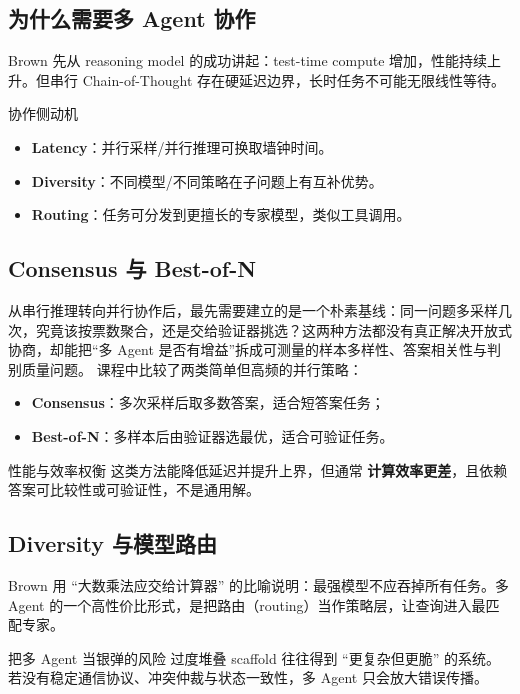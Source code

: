 \documentclass[a4paper]{article}
\begin{document}
\subsection{为什么需要多 Agent 协作}
Brown 先从 reasoning model 的成功讲起：test-time compute 增加，性能持续上升。但串行 Chain-of-Thought 存在硬延迟边界，长时任务不可能无限线性等待。

\begin{knowledgebox}{协作侧动机}
\begin{itemize}
    \item \textbf{Latency}：并行采样/并行推理可换取墙钟时间。
    \item \textbf{Diversity}：不同模型/不同策略在子问题上有互补优势。
    \item \textbf{Routing}：任务可分发到更擅长的专家模型，类似工具调用。
\end{itemize}
\end{knowledgebox}

\subsection{Consensus 与 Best-of-N}
从串行推理转向并行协作后，最先需要建立的是一个朴素基线：同一问题多采样几次，究竟该按票数聚合，还是交给验证器挑选？这两种方法都没有真正解决开放式协商，却能把“多 Agent 是否有增益”拆成可测量的样本多样性、答案相关性与判别质量问题。
课程中比较了两类简单但高频的并行策略：
\begin{itemize}
    \item \textbf{Consensus}：多次采样后取多数答案，适合短答案任务；
    \item \textbf{Best-of-N}：多样本后由验证器选最优，适合可验证任务。
\end{itemize}

\begin{importantbox}{性能与效率权衡}
这类方法能降低延迟并提升上界，但通常 \textbf{计算效率更差}，且依赖答案可比较性或可验证性，不是通用解。
\end{importantbox}

\subsection{Diversity 与模型路由}
Brown 用 ``大数乘法应交给计算器'' 的比喻说明：最强模型不应吞掉所有任务。多 Agent 的一个高性价比形式，是把路由（routing）当作策略层，让查询进入最匹配专家。

\begin{warningbox}{把多 Agent 当银弹的风险}
过度堆叠 scaffold 往往得到 ``更复杂但更脆'' 的系统。若没有稳定通信协议、冲突仲裁与状态一致性，多 Agent 只会放大错误传播。
\end{warningbox}
\end{document}
